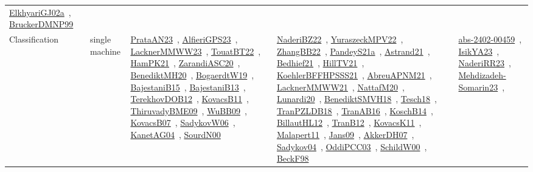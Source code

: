 {\begin{longtable}{lp{3cm}>{\raggedright\arraybackslash}p{6cm}>{\raggedright\arraybackslash}p{6cm}>{\raggedright\arraybackslash}p{8cm}}
\href{works/ElkhyariGJ02a.pdf}{ElkhyariGJ02a}~\cite{ElkhyariGJ02a}, \href{works/BruckerDMNP99.pdf}{BruckerDMNP99}~\cite{BruckerDMNP99}\\
Classification & single machine & \href{works/PrataAN23.pdf}{PrataAN23}~\cite{PrataAN23}, \href{works/AlfieriGPS23.pdf}{AlfieriGPS23}~\cite{AlfieriGPS23}, \href{works/LacknerMMWW23.pdf}{LacknerMMWW23}~\cite{LacknerMMWW23}, \href{works/TouatBT22.pdf}{TouatBT22}~\cite{TouatBT22}, \href{works/HamPK21.pdf}{HamPK21}~\cite{HamPK21}, \href{works/ZarandiASC20.pdf}{ZarandiASC20}~\cite{ZarandiASC20}, \href{works/BenediktMH20.pdf}{BenediktMH20}~\cite{BenediktMH20}, \href{works/BogaerdtW19.pdf}{BogaerdtW19}~\cite{BogaerdtW19}, \href{works/BajestaniB15.pdf}{BajestaniB15}~\cite{BajestaniB15}, \href{works/BajestaniB13.pdf}{BajestaniB13}~\cite{BajestaniB13}, \href{works/TerekhovDOB12.pdf}{TerekhovDOB12}~\cite{TerekhovDOB12}, \href{works/KovacsB11.pdf}{KovacsB11}~\cite{KovacsB11}, \href{works/ThiruvadyBME09.pdf}{ThiruvadyBME09}~\cite{ThiruvadyBME09}, \href{works/WuBB09.pdf}{WuBB09}~\cite{WuBB09}, \href{works/KovacsB07.pdf}{KovacsB07}~\cite{KovacsB07}, \href{works/SadykovW06.pdf}{SadykovW06}~\cite{SadykovW06}, \href{works/KanetAG04.pdf}{KanetAG04}~\cite{KanetAG04}, \href{works/SourdN00.pdf}{SourdN00}~\cite{SourdN00} & \href{works/NaderiBZ22.pdf}{NaderiBZ22}~\cite{NaderiBZ22}, \href{works/YuraszeckMPV22.pdf}{YuraszeckMPV22}~\cite{YuraszeckMPV22}, \href{works/ZhangBB22.pdf}{ZhangBB22}~\cite{ZhangBB22}, \href{works/PandeyS21a.pdf}{PandeyS21a}~\cite{PandeyS21a}, \href{works/Astrand21.pdf}{Astrand21}~\cite{Astrand21}, \href{works/Bedhief21.pdf}{Bedhief21}~\cite{Bedhief21}, \href{works/HillTV21.pdf}{HillTV21}~\cite{HillTV21}, \href{works/KoehlerBFFHPSSS21.pdf}{KoehlerBFFHPSSS21}~\cite{KoehlerBFFHPSSS21}, \href{works/AbreuAPNM21.pdf}{AbreuAPNM21}~\cite{AbreuAPNM21}, \href{works/LacknerMMWW21.pdf}{LacknerMMWW21}~\cite{LacknerMMWW21}, \href{works/NattafM20.pdf}{NattafM20}~\cite{NattafM20}, \href{works/Lunardi20.pdf}{Lunardi20}~\cite{Lunardi20}, \href{works/BenediktSMVH18.pdf}{BenediktSMVH18}~\cite{BenediktSMVH18}, \href{works/Tesch18.pdf}{Tesch18}~\cite{Tesch18}, \href{works/TranPZLDB18.pdf}{TranPZLDB18}~\cite{TranPZLDB18}, \href{works/TranAB16.pdf}{TranAB16}~\cite{TranAB16}, \href{works/KoschB14.pdf}{KoschB14}~\cite{KoschB14}, \href{works/BillautHL12.pdf}{BillautHL12}~\cite{BillautHL12}, \href{works/TranB12.pdf}{TranB12}~\cite{TranB12}, \href{works/KovacsK11.pdf}{KovacsK11}~\cite{KovacsK11}, \href{works/Malapert11.pdf}{Malapert11}~\cite{Malapert11}, \href{works/Jans09.pdf}{Jans09}~\cite{Jans09}, \href{works/AkkerDH07.pdf}{AkkerDH07}~\cite{AkkerDH07}, \href{works/Sadykov04.pdf}{Sadykov04}~\cite{Sadykov04}, \href{works/OddiPCC03.pdf}{OddiPCC03}~\cite{OddiPCC03}, \href{works/SchildW00.pdf}{SchildW00}~\cite{SchildW00}, \href{works/BeckF98.pdf}{BeckF98}~\cite{BeckF98} & \href{works/abs-2402-00459.pdf}{abs-2402-00459}~\cite{abs-2402-00459}, \href{works/IsikYA23.pdf}{IsikYA23}~\cite{IsikYA23}, \href{works/NaderiRR23.pdf}{NaderiRR23}~\cite{NaderiRR23}, \href{works/Mehdizadeh-Somarin23.pdf}{Mehdizadeh-Somarin23}~\cite{Mehdizadeh-Somarin23}, 
\end{longtable}}
